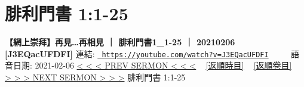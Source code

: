 \documentclass{book}
\begin{document}
\section{腓利門書 1:1-25}
\label{sec:J3EQacUFDFI}
\textbf{【網上崇拜】再見…再相見 ｜ 腓利門書1\_1-25 ｜ 20210206 [J3EQacUFDFI]}
\newline
\newline
連結: \href{https://youtube.com/watch?v=J3EQacUFDFI}{\texttt{ https://youtube.com/watch?v=J3EQacUFDFI}} ~~~~ 語音日期: 2021-02-06 
\newline
\newline
\hyperref[sec:OfpcASuB51M]{\small{< < < PREV SERMON < < <}}
~
\hyperref[sec:index_chronic]{\small{[返順時目]}}
~
\hyperref[sec:index_scriptual]{\small{[返順卷目]}}
~
\hyperref[sec:yt29IwiNPNk]{\small{> > > NEXT SERMON > > >}}
\newline
\newline
腓利門書 1:1-25
\newline
\end{document}
